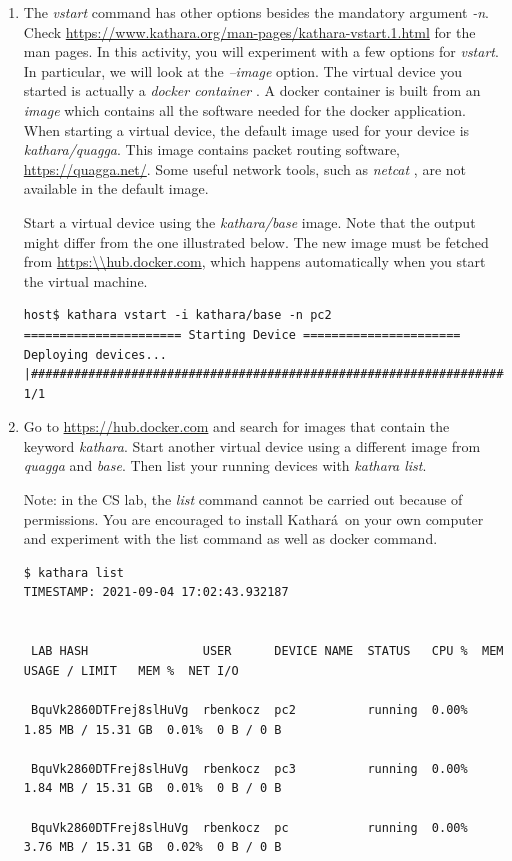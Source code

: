 \documentclass[12pt]{book}
\newcommand{\kathara}{Kathar\'a}
\begin{document}
\begin{enumerate}[resume*]
\item The \emph{vstart} command has other options besides the mandatory argument \emph{-n}. Check \url{https://www.kathara.org/man-pages/kathara-vstart.1.html} for the man pages. In this activity, you will experiment with a few options for \emph{vstart}. In particular, we will look at the \emph{--image} option. The virtual device you started is actually a \emph{docker container} \cite{docker-useful}. A docker container is built from an \emph{image} which contains all the software needed for the docker application. When starting a virtual device, the default image used for your device is \emph{kathara/quagga}. This image contains packet routing software, \url{https://quagga.net/}. Some useful network tools, such as \emph{netcat} \cite{netcat}, are not available in the default image.

  Start a virtual device using the \emph{kathara/base} image. Note that the output might differ from the one illustrated below. The new image must be fetched from \url{https:\\hub.docker.com}, which happens automatically when you start the virtual machine.

\begin{lstlisting}
host$ kathara vstart -i kathara/base -n pc2
====================== Starting Device ======================
Deploying devices... |#######################################################################################| 1/1
\end{lstlisting}

\item Go to \url{https://hub.docker.com} and search for images that contain the keyword \emph{kathara}. Start another virtual device using a different image from \emph{quagga} and \emph{base}. Then list your running devices with \emph{kathara list}.

  Note: in the CS lab, the \emph{list} command cannot be carried out because of permissions. You are encouraged to install \kathara\ on your own computer and experiment with the list command as well as docker command.

\begin{lstlisting}
$ kathara list
TIMESTAMP: 2021-09-04 17:02:43.932187


 LAB HASH                USER      DEVICE NAME  STATUS   CPU %  MEM USAGE / LIMIT   MEM %  NET I/O   

 BquVk2860DTFrej8slHuVg  rbenkocz  pc2          running  0.00%  1.85 MB / 15.31 GB  0.01%  0 B / 0 B 

 BquVk2860DTFrej8slHuVg  rbenkocz  pc3          running  0.00%  1.84 MB / 15.31 GB  0.01%  0 B / 0 B 

 BquVk2860DTFrej8slHuVg  rbenkocz  pc           running  0.00%  3.76 MB / 15.31 GB  0.02%  0 B / 0 B 

\end{lstlisting}

\end{enumerate}
\end{document}
